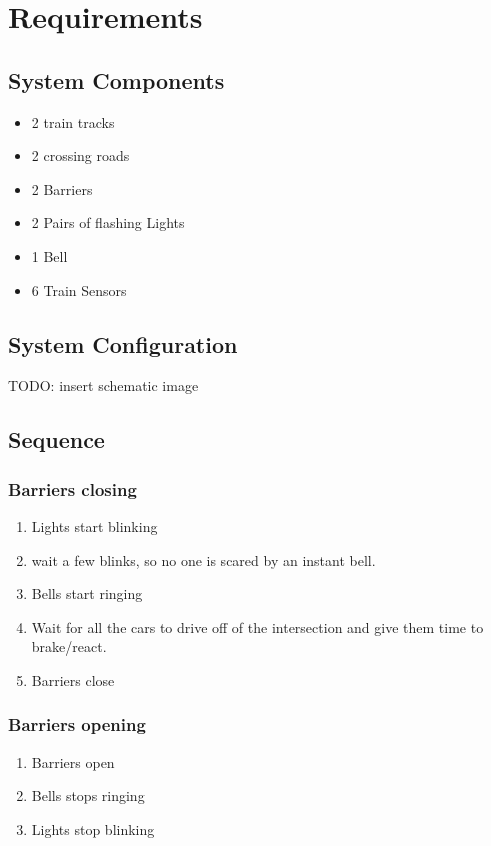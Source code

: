 \documentclass[final]{report}
\begin{document}
\chapter{Requirements}

\section{System Components}
\begin{itemize}
\item 2 train tracks
\item 2 crossing roads
\item 2 Barriers
\item 2 Pairs of flashing Lights
\item 1 Bell
\item 6 Train Sensors
\end{itemize}
\section{System Configuration}
TODO: insert schematic image
\section{Sequence}

\subsection{Barriers closing}
\begin{enumerate}
\item Lights start blinking
\item wait a few blinks, so no one is scared by an instant bell. %
\item Bells start ringing
\item Wait for all the cars to drive off of the intersection and give them time to brake/react.
\item Barriers close
\end{enumerate}

\subsection{Barriers opening}
\begin{enumerate}
\item Barriers open
\item Bells stops ringing
\item Lights stop blinking
\end{enumerate}
\end{document}
